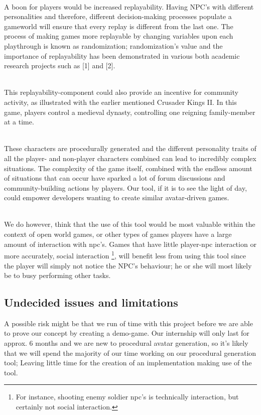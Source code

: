 \documentclass[11pt]{article}
\begin{document}
~\\
A boon for players would be increased replayability. Having NPC's with different personalities and therefore, different decision-making processes populate a gameworld will ensure that every replay is different from the last one. The process of making games more replayable by changing variables upon each playthrough is known as randomization; randomization's value and the importance of replayability has been demonstrated in various both academic research projects such as [1] and [2].

~\\
This replayability-component could also provide an incentive for community activity, as illustrated with the earlier mentioned Crusader Kings II. In this game, players control a medieval dynasty, controlling one reigning family-member at a time. 

~\\
These characters are procedurally generated and the different personality traits of all the player- and non-player characters combined can lead to incredibly complex situations. The complexity of the game itself, combined with the endless amount of situations that can occur have sparked a lot of forum discussions and community-building actions by players. Our tool, if it is to see the light of day, could empower developers wanting to create similar avatar-driven games.

~\\
We do however, think that the use of this tool would be most valuable within the context of open world games, or other types of games players have a large amount of interaction with npc's. Games that have little player-npc interaction or more accurately, social interaction \footnote{For instance, shooting enemy soldier npc's is technically interaction, but certainly not social interaction.}, will benefit less from using this tool since the player will simply not notice the NPC's behaviour; he or she will most likely be to busy performing other tasks.


\newpage
{}
{}
\subsection*{Undecided issues and limitations}
A possible risk might be that we run of time with this project before we are able to prove our concept by creating a demo-game. Our internship will only last for approx. 6 months and we are new to procedural avatar generation, so it's likely that we will spend the majority of our time working on our procedural generation tool; Leaving little time for the creation of an implementation making use of the tool.
\end{document}
